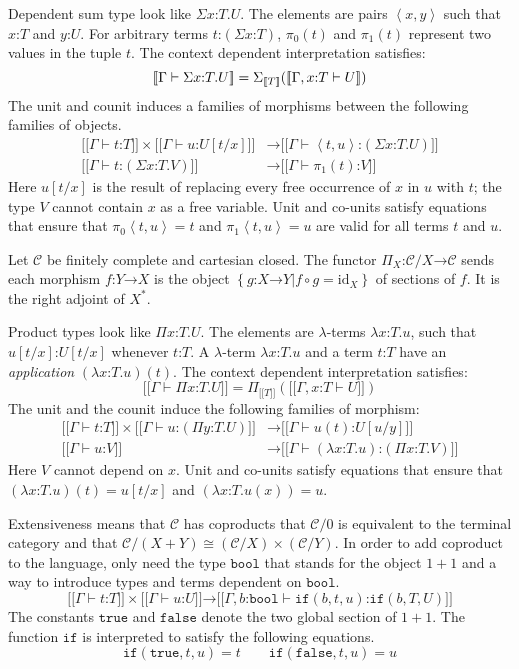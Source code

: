 \documentclass{amsart}
\theoremstyle{plain}
\theoremstyle{definition}
\newcommand\cat\mathcal
\newcommand\set[1]{\left\{#1\right\}}
\newcommand\id{\mathrm{id}}
\newcommand\ri{^*}
\newcommand\of{\mathord:}
\renewcommand\to{\mathord\rightarrow}
\newcommand\db[1]{{[\![}#1{]\!]}}
\begin{document}
\newcommand\tuple[1]{\left\langle #1 \right\rangle}
Dependent sum type look like $\Sigma x\of T.U$. The elements are pairs $\tuple{x,y}$ such that $x\of T$ and $y\of U$. For arbitrary terms $t\of(\Sigma x\of T)$, $\pi_0(t)$ and $\pi_1(t)$ represent two values in the tuple $t$. The context dependent interpretation satisfies:
\[ \db{\Gamma\vdash\Sigma x\of T.U} = \dsum {\db T}(\db{\Gamma,x\of T\vdash U}) \]
The unit and counit induces a families of morphisms between the following families of objects.
\begin{align*}
\db{\Gamma\vdash t\of T}\times\db{\Gamma\vdash u\of U[t/x]} &\to \db{\Gamma\vdash \tuple{t, u}\of(\Sigma x\of T.U)}\\
\db{\Gamma\vdash t\of (\Sigma x\of T.V)}&\to \db{\Gamma\vdash \pi_1(t) \of V}
\end{align*}
Here $u[t/x]$ is the result of replacing every free occurrence of $x$ in $u$ with $t$; the type $V$ cannot contain $x$ as a free variable. Unit and co-units satisfy equations that ensure that $\pi_0\tuple{t,u}=t$ and $\pi_1\tuple{t,u}=u$ are valid for all terms $t$ and $u$.

\newcommand\dprod{\Pi_}
Let $\cat C$ be finitely complete and cartesian closed. The functor $\dprod X\of\cat C/X\to \cat C$ sends each morphism $f\of Y\to X$ is the object $\set{g\of X\to Y| f\circ g = \id_X }$ of sections of $f$. It is the right adjoint of $X\ri$.

Product types look like $\Pi x\of T.U$. The elements are $\lambda$-terms $\lambda x\of T.u$, such that $u[t/x]\of U[t/x]$ whenever $t\of T$. A $\lambda$-term $\lambda x\of T.u$ and a term $t\of T$ have an \emph{application} $(\lambda x\of T.u)(t)$. The context dependent interpretation satisfies:
\[ \db{\Gamma\vdash\Pi x\of T.U} = \dprod {\db T}(\db{\Gamma,x\of T\vdash U}) \]
The unit and the counit induce the following families of morphism:
\begin{align*}
\db{\Gamma\vdash t\of T}\times\db{\Gamma\vdash u\of(\Pi y\of T.U)}&\to\db{\Gamma\vdash u(t)\of U[u/y]}\\
\db{\Gamma\vdash u\of V}&\to\db{\Gamma\vdash (\lambda x\of T.u)\of(\Pi x\of T.V)}
\end{align*}
Here $V$ cannot depend on $x$. Unit and co-units satisfy equations that ensure that $(\lambda x\of T.u)(t) = u[t/x]$ and $(\lambda x\of T.u(x))=u$.

\newcommand\true{\mathtt{true}}
\newcommand\false{\mathtt{false}}
\newcommand\bool{\mathtt{bool}}
\newcommand\ttif{\mathtt{if}}
Extensiveness means that $\cat C$ has coproducts that $\cat C/0$ is equivalent to the terminal category and that $\cat C/(X+Y)\cong (\cat C/X)\times(\cat C/Y)$. In order to add coproduct to the language, only need the type $\bool$ that stands for the object $1+1$ and a way to introduce types and terms dependent on $\bool$.
\[ \db{\Gamma\vdash t\of T}\times\db{\Gamma\vdash u\of U}\to\db{\Gamma,b\of\bool\vdash \ttif(b,t,u)\of\ttif(b,T,U)} \]
The constants $\true$ and $\false$ denote the two global section of $1+1$. The function $\ttif$ is interpreted to satisfy the following equations.
\[ \ttif(\true,t,u)=t\qquad\ttif(\false,t,u) = u\]
\end{document}
